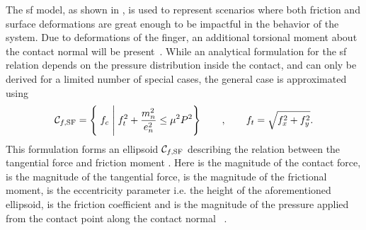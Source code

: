 The \gls{sf} model, as shown in , is used to represent scenarios where both friction and surface deformations are great enough to be impactful in the behavior of the system. Due to deformations of the finger, an additional torsional moment about the contact normal will be present~\cite[Chapter 38]{handbook-of-robotics}. While an analytical formulation for the \gls{sf} relation depends on the pressure distribution inside the contact, and can only be derived for a limited number of special cases, the general case is approximated using 
%
\begin{equation} 
	\mathcal{C}_{f,\text{SF}} = \left\{ \; f_c \; \middle| \; f_t^2 + \frac{m_n^2}{e_n^2} \le \mu^2 P^2 \right\} \qquad , \qquad f_t = \sqrt{f_x^2 + f_y^2}.
	\label{eq:sf}
\end{equation}
This formulation forms an ellipsoid $\mathcal{C}_{f,\text{SF}}$ describing the relation between the tangential force  and friction moment . Here  is the magnitude of the contact force,  is the magnitude of the tangential force,  is the magnitude of the frictional moment,  is the eccentricity parameter i.e. the height of the aforementioned ellipsoid, \mvar{\mu} is the friction coefficient and  is the magnitude of the pressure applied from the contact point along the contact normal ~\cite{practical-force-motion-models-for-sliding-manipulation, soft-finger-model-with-adaptive-contact-geometry-for-grasping-and-manipulation-tasks}. \medskip

